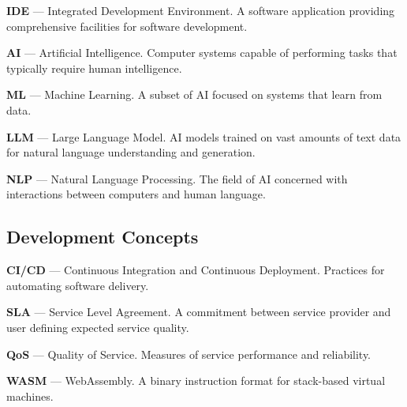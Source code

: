 \noindent\textbf{IDE} --- Integrated Development Environment. A software application providing comprehensive facilities for software development.

\vspace{0.2cm}

\noindent\textbf{AI} --- Artificial Intelligence. Computer systems capable of performing tasks that typically require human intelligence.

\vspace{0.2cm}

\noindent\textbf{ML} --- Machine Learning. A subset of AI focused on systems that learn from data.

\vspace{0.2cm}

\noindent\textbf{LLM} --- Large Language Model. AI models trained on vast amounts of text data for natural language understanding and generation.

\vspace{0.2cm}

\noindent\textbf{NLP} --- Natural Language Processing. The field of AI concerned with interactions between computers and human language.

\subsection*{Development Concepts}

\vspace{0.3cm}

\noindent\textbf{CI/CD} --- Continuous Integration and Continuous Deployment. Practices for automating software delivery.

\vspace{0.2cm}

\noindent\textbf{SLA} --- Service Level Agreement. A commitment between service provider and user defining expected service quality.

\vspace{0.2cm}

\noindent\textbf{QoS} --- Quality of Service. Measures of service performance and reliability.

\vspace{0.2cm}

\noindent\textbf{WASM} --- WebAssembly. A binary instruction format for stack-based virtual machines.

\vspace{0.2cm}

